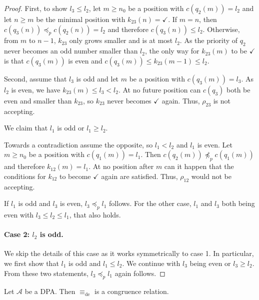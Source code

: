 \begin{proof}
	First, to show $l_3 \leq l_2$, let $m \geq n_0$ be a position with $c(q_2(m)) = l_2$ and let $n \geq m$ be the minimal position with $k_{23}(n) = \checkmark$. If $m = n$, then $c(q_3(n)) \preceq_p c(q_2(n)) = l_2$ and therefore $c(q_3(n)) \leq l_2$. Otherwise, from $m$ to $n-1$, $k_{23}$ only grows smaller and is at most $l_2$. As the priority of $q_2$ never becomes an odd number smaller than $l_2$, the only way for $k_{23}(m)$ to be $\checkmark$ is that $c(q_3(m))$ is even and $c(q_3(m)) \leq k_{23}(m-1) \leq l_2$.
	
	Second, assume that $l_3$ is odd and let $m$ be a position with $c(q_3(m)) = l_3$. As $l_2$ is even, we have $k_{23}(m) \leq l_3 < l_2$. At no future position can $c(q_3)$ both be even and smaller than $k_{23}$, so $k_{23}$ never becomes $\checkmark$ again. Thus, $\rho_{23}$ is not accepting.
	
	We claim that $l_1$ is odd or $l_1 \geq l_2$.
	
	Towards a contradiction assume the opposite, so $l_1 < l_2$ and $l_1$ is even. Let $m \geq n_0$ be a position with $c(q_1(m)) = l_1$. Then $c(q_2(m)) \not\preceq_p c(q_1(m))$ and therefore $k_{12}(m) = l_1$. At no position after $m$ can it happen that the conditions for $k_{12}$ to become $\checkmark$ again are satisfied. Thus, $\rho_{12}$ would not be accepting.
	
	If $l_1$ is odd and $l_3$ is even, $l_3 \preceq_p l_1$ follows. For the other case, $l_1$ and $l_3$ both being even with $l_3 \leq l_2 \leq l_1$, that also holds.
	
	\paragraph{Case 2: $l_2$ is odd.} We skip the details of this case as it works symmetrically to case 1. In particular, we first show that $l_1$ is odd and $l_1 \leq l_2$. We continue with $l_3$ being even or $l_3 \geq l_2$. From these two statements, $l_3 \preceq_p l_1$ again follows.
\end{proof}

\begin{lem}
	Let $\mathcal{A}$ be a DPA. Then $\equiv_\text{de}$ is a congruence relation.
\end{lem}


